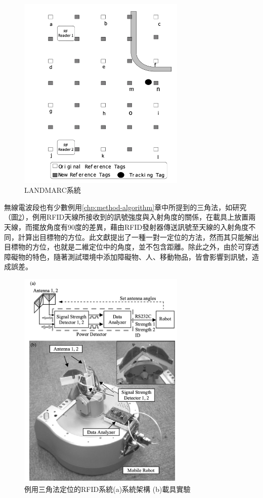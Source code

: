        \begin{figure}[h]
            \centering
            \includegraphics[width=8cm]{ch2pic/landmarc.png}
            \caption{LANDMARC系統\cite{landmarc}}
            \label{pic:landmarc}
        \end{figure}

        無線電波段也有少數例用\ref{chp:method-algorithm}章中所提到的三角法，如\cite{case:rfid_1to1}研究（圖\ref{pic:rfid_1to1}），例用RFID天線所接收到的訊號強度與入射角度的關係，在載具上放置兩天線，而擺放角度有90度的差異，藉由RFID發射器傳送訊號至天線的入射角度不同，計算出目標物的方位。此文獻提出了一種一對一定位的方法，然而其只能解出目標物的方位，也就是二維定位中的角度，並不包含距離。除此之外，由於可穿透障礙物的特色，隨著測試環境中添加障礙物、人、移動物品，皆會影響到訊號，造成誤差。

        \begin{figure}[h]
            \centering
            \includegraphics[width=8cm]{ch2pic/rfid_1to1.png}
            \caption{例用三角法定位的RFID系統\cite{case:rfid_1to1}(a)系統架構 (b)載具實驗}
            \label{pic:rfid_1to1}
        \end{figure}
        
